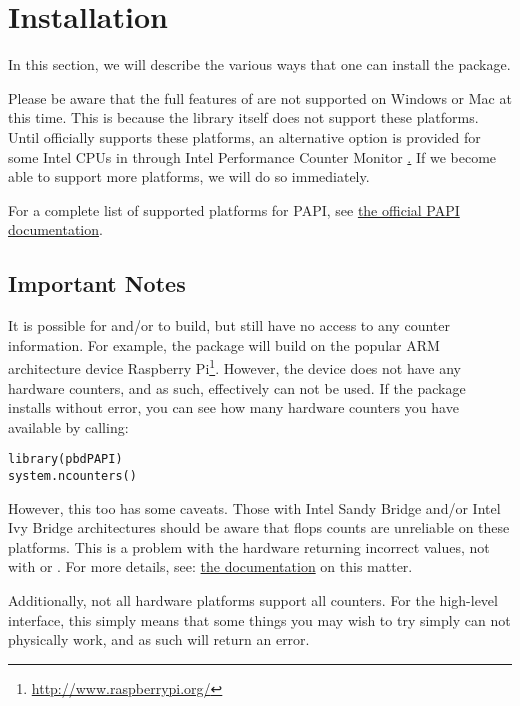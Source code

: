 \section{Installation}
\label{sec:installation}

In this section, we will describe the various ways that one can install the 
\thispackage package.

Please be aware that the full features of \thispackage are not supported on
Windows or Mac at this time.  This is because the \PAPI library itself does
not support these platforms.  Until \PAPI officially supports these platforms,
an alternative option is provided for some Intel CPUs in \thispackage through
Intel Performance Counter Monitor \href{http://www.intel.com/software/pcm}.
If we become able to support more platforms, we will do so 
immediately.

For a complete list of supported platforms for PAPI, see 
\href{http://icl.cs.utk.edu/papi/custom/index.html?lid=62&slid=96}%
{the official PAPI documentation}.



\subsection{Important Notes}

It is possible for \PAPI and/or \thispackage to build, but still have no access
to any counter information.  For example, the package will build on the popular 
ARM architecture device 
Raspberry Pi\footnote{\url{http://www.raspberrypi.org/}}.
However, the device does not have any hardware counters, and as such, 
\thispackage effectively can not be used.  If the package installs without 
error, you can see how many hardware counters you have available by calling:
\begin{lstlisting}[language=rr]
library(pbdPAPI)
system.ncounters()
\end{lstlisting}

However, this too has some caveats.  Those with Intel Sandy Bridge and/or Intel 
Ivy Bridge architectures should be aware that flops counts are unreliable on 
these platforms.  This is a problem with the hardware returning incorrect 
values, not with \PAPI or \thispackage.  For more details, see: 
\href{http://icl.cs.utk.edu/projects/papi/wiki/PAPITopics:SandyFlops}%
{the \PAPI documentation} on this matter.


Additionally, not all hardware platforms support all counters.  For the 
high-level 
interface, this simply means that some things you may wish to try simply can 
not physically work, and as such will return an error.  

